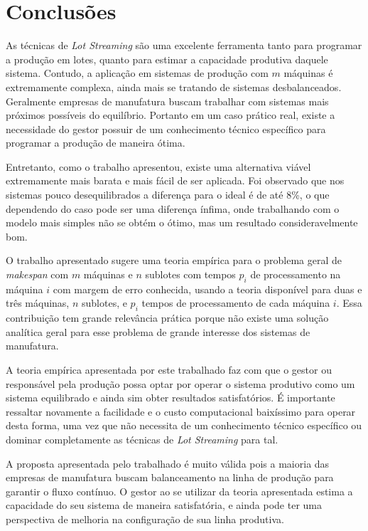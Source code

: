 \section{Conclusões} \label{sec:conclusoes}

As técnicas de \textit{Lot Streaming} são uma excelente ferramenta tanto para programar a produção em lotes, quanto para estimar a capacidade produtiva daquele sistema. Contudo, a aplicação em sistemas de produção com $m$ máquinas é extremamente complexa, ainda mais se tratando de sistemas desbalanceados. Geralmente empresas de manufatura buscam trabalhar com sistemas mais próximos possíveis do equilíbrio. Portanto em um caso prático real, existe a necessidade do gestor possuir de um conhecimento técnico específico para programar a produção de maneira ótima.

Entretanto, como o trabalho apresentou, existe uma alternativa viável extremamente mais barata e mais fácil de ser aplicada. Foi observado que nos sistemas pouco desequilibrados a diferença para o ideal é de até 8\%, o que dependendo do caso pode ser uma diferença ínfima, onde trabalhando com o modelo mais simples não se obtém o ótimo, mas um resultado consideravelmente bom. 

O trabalho apresentado sugere uma teoria empírica para o problema geral de \textit{makespan} com $m$ máquinas e $n$ sublotes com tempos $p_i$ de processamento na máquina $i$ com margem de erro conhecida, usando a teoria disponível para duas e três máquinas, $n$ sublotes, e $p_i$ tempos de processamento de cada máquina $i$. Essa contribuição tem grande relevância prática porque não existe uma solução analítica geral para esse problema de grande interesse dos sistemas de manufatura.

A teoria empírica apresentada por este trabalhado faz com que o gestor ou responsável pela produção possa optar por operar o sistema produtivo como um sistema equilibrado e ainda sim obter resultados satisfatórios. É importante ressaltar novamente a facilidade e o custo computacional baixíssimo para operar desta forma, uma vez que não necessita de um conhecimento técnico específico ou dominar completamente as técnicas de \textit{Lot Streaming} para tal. 

A proposta apresentada pelo trabalhado é muito válida pois a maioria das empresas de manufatura buscam balanceamento na linha de produção para garantir o fluxo contínuo. O gestor ao se utilizar da teoria apresentada estima a capacidade do seu sistema de maneira satisfatória, e ainda pode ter uma perspectiva de melhoria na configuração de sua linha produtiva. 

